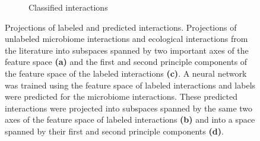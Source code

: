 \begin{figure}
\begin{subfigure}[b]{0.45\textwidth}
        \caption{Classified interactions}
    \end{subfigure}
    \caption{Projections of labeled and predicted interactions. Projections of unlabeled microbiome interactions and ecological interactions from the literature into subspaces spanned by two important axes of the feature space \textbf{(a)} and the first and second principle components of the feature space of the labeled interactions \textbf{(c)}. A neural network was trained using the feature space of labeled interactions and labels were predicted for the microbiome interactions. These predicted interactions were projected into subspaces spanned by the same two axes of the feature space of labeled interactions \textbf{(b)} and into a space spanned by their first and second principle components \textbf{(d)}.}
    \label{fig:FP_classified}
\end{figure}